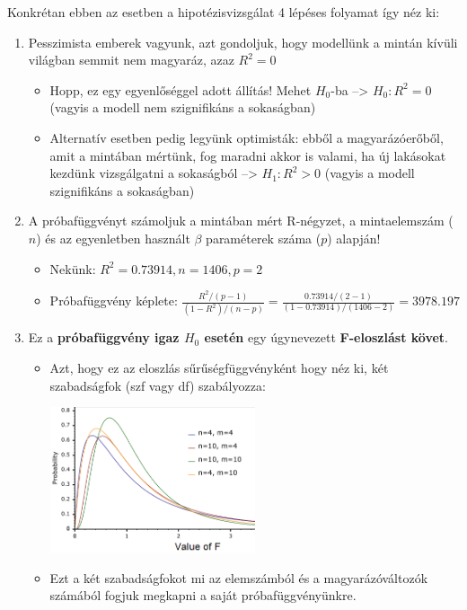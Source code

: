 \documentclass[
]{book}
\providecommand{\tightlist}{%
  \setlength{\itemsep}{0pt}\setlength{\parskip}{0pt}}
\begin{document}
Konkrétan ebben az esetben a hipotézisvizsgálat 4 lépéses folyamat így néz ki:

\begin{enumerate}
\def\labelenumi{\arabic{enumi}.}
\tightlist
\item
  Pesszimista emberek vagyunk, azt gondoljuk, hogy modellünk a mintán kívüli világban semmit nem magyaráz, azaz \(R^2=0\)

  \begin{itemize}
  \tightlist
  \item
    Hopp, ez egy egyenlőséggel adott állítás! Mehet \(H_0\)-ba --\textgreater{} \(H_0: R^2 = 0\) (vagyis a modell nem szignifikáns a sokaságban)
  \item
    Alternatív esetben pedig legyünk optimisták: ebből a magyarázóerőből, amit a mintában mértünk, fog maradni akkor is valami, ha új lakásokat kezdünk vizsgálgatni a sokaságból --\textgreater{} \(H_1: R^2 > 0\) (vagyis a modell szignifikáns a sokaságban)
  \end{itemize}
\item
  A próbafüggvényt számoljuk a mintában mért R-négyzet, a mintaelemszám (\(n\)) és az egyenletben használt \(\beta\) paraméterek száma (\(p\)) alapján!

  \begin{itemize}
  \tightlist
  \item
    Nekünk: \(R^2=0.73914, n=1406, p=2\)
  \item
    Próbafüggvény képlete: \(\frac{R^2/(p-1)}{(1-R^2)/(n-p)}=\frac{0.73914/(2-1)}{(1-0.73914)/(1406-2)}=3978.197\)
  \end{itemize}
\item
  Ez a \textbf{próbafüggvény igaz \(H_0\) esetén} egy úgynevezett \textbf{F-eloszlást követ}.

  \begin{itemize}
  \tightlist
  \item
    Azt, hogy ez az eloszlás sűrűségfüggvényként hogy néz ki, két szabadságfok (szf vagy df) szabályozza:

    \includegraphics[width=0.5\textwidth,height=\textheight]{Fdist.png}
  \item
    Ezt a két szabadságfokot mi az elemszámból és a magyarázóváltozók számából fogjuk megkapni a saját próbafüggvényünkre.


\end{itemize}
\end{enumerate}
\end{document}
